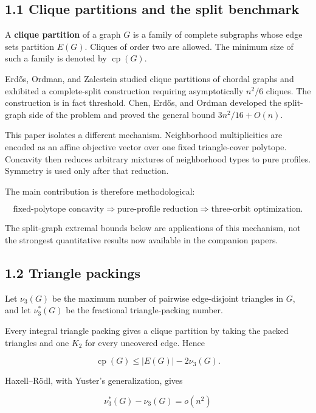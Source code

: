 \documentclass[11pt,a4paper]{article}
\begin{document}
\subsection{1.1 Clique partitions and the split benchmark}\label{clique-partitions-and-the-split-benchmark}

A \textbf{clique partition} of a graph \(G\) is a family of complete subgraphs whose edge sets partition \(E(G)\). Cliques of order two are allowed. The minimum size of such a family is denoted by \(\operatorname{cp}(G)\).

Erdős, Ordman, and Zalcstein studied clique partitions of chordal graphs and exhibited a complete-split construction requiring asymptotically \(n^2/6\) cliques. The construction is in fact threshold. Chen, Erdős, and Ordman developed the split-graph side of the problem and proved the general bound \(3n^2/16+O(n)\).

This paper isolates a different mechanism. Neighborhood multiplicities are encoded as an affine objective vector over one fixed triangle-cover polytope. Concavity then reduces arbitrary mixtures of neighborhood types to pure profiles. Symmetry is used only after that reduction.

The main contribution is therefore methodological:

\[
\boxed{
\text{fixed-polytope concavity}
\Longrightarrow
\text{pure-profile reduction}
\Longrightarrow
\text{three-orbit optimization}.
}
\]

The split-graph extremal bounds below are applications of this mechanism, not the strongest quantitative results now available in the companion papers.

\subsection{1.2 Triangle packings}\label{triangle-packings}

Let \(\nu_3(G)\) be the maximum number of pairwise edge-disjoint triangles in \(G\), and let \(\nu_3^*(G)\) be the fractional triangle-packing number.

Every integral triangle packing gives a clique partition by taking the packed triangles and one \(K_2\) for every uncovered edge. Hence

\[
\operatorname{cp}(G)\le |E(G)|-2\nu_3(G).
\tag{1.1}
\]

Haxell--Rödl, with Yuster's generalization, gives

\[
\nu_3^*(G)-\nu_3(G)=o(n^2)
\tag{1.2}
\]
\end{document}
